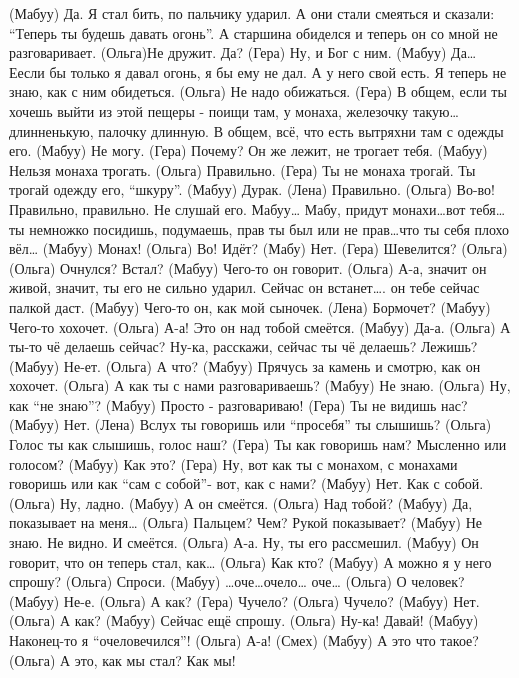  (Мабуу) Да. Я стал бить, по пальчику ударил. А они стали смеяться и сказали: ``Теперь ты будешь давать огонь''. А старшина обиделся и теперь он со мной не разговаривает.
 (Ольга)Не дружит. Да?
 (Гера) Ну, и Бог с ним.
 (Мабуу) Да… Еесли бы только я давал огонь, я бы ему не дал. А у него свой есть. Я теперь не знаю, как с ним обидеться. 
 (Ольга) Не надо обижаться. 
 (Гера)  В общем, если ты хочешь выйти из этой пещеры - поищи там, у монаха, железочку такую…длинненькую, палочку длинную. В общем, всё, что есть вытряхни там с одежды его.
 (Мабуу)  Не могу.
 (Гера)   Почему? Он же лежит, не трогает тебя.
 (Мабуу)  Нельзя монаха трогать. 
 (Ольга)  Правильно.
 (Гера)   Ты не монаха трогай. Ты трогай одежду его, ``шкуру''. 
 (Мабуу)  Дурак.
 (Лена)   Правильно.
 (Ольга)  Во-во! Правильно, правильно. Не слушай его. Мабуу… Мабу, придут монахи…вот тебя… ты немножко посидишь, подумаешь, прав ты был или не прав…что ты себя плохо вёл…
 (Мабуу) Монах!
 (Ольга) Во! Идёт?
 (Мабу)  Нет.
 (Гера)  Шевелится?  (Ольга) 
 (Ольга) Очнулся?  Встал?
 (Мабуу) Чего-то он говорит. 
 (Ольга) А-а, значит он живой, значит, ты его не сильно ударил. Сейчас он  встанет…. он тебе сейчас палкой даст.
 (Мабуу) Чего-то  он, как мой сыночек. 
 (Лена)  Бормочет?
 (Мабуу) Чего-то хохочет.
 (Ольга) А-а! Это он над тобой смеётся. 
 (Мабуу) Да-а.
 (Ольга) А ты-то чё делаешь сейчас? Ну-ка, расскажи, сейчас ты чё делаешь? Лежишь? 
 (Мабуу) Не-ет.
 (Ольга) А что?
 (Мабуу) Прячусь за камень и смотрю, как он хохочет.
 (Ольга) А как ты с нами разговариваешь?
 (Мабуу) Не знаю. 
 (Ольга) Ну, как ``не знаю''?
 (Мабуу) Просто - разговариваю!
 (Гера)  Ты не видишь нас?
 (Мабуу) Нет. 
 (Лена)  Вслух ты говоришь или ``просебя'' ты слышишь?
 (Ольга) Голос ты как слышишь, голос наш?
 (Гера)  Ты как говоришь нам? Мысленно или голосом?
 (Мабуу) Как это?
 (Гера)  Ну, вот как ты с монахом, с монахами  говоришь или как ``сам с собой”- вот,  как с нами?
 (Мабуу) Нет.  Как с собой. 
 (Ольга) Ну, ладно.
 (Мабуу) А он смеётся. 
 (Ольга) Над тобой?  
 (Мабуу) Да, показывает на меня…
 (Ольга) Пальцем? Чем?  Рукой показывает?
 (Мабуу) Не знаю. Не видно. И смеётся. 
 (Ольга) А-а. Ну, ты его рассмешил. 
 (Мабуу) Он говорит, что он теперь стал, как…
 (Ольга) Как кто? 
 (Мабуу) А можно я у него спрошу? 
 (Ольга) Спроси. 
 (Мабуу) …оче…очело… оче…
 (Ольга) О человек? 
 (Мабуу) Не-е.
 (Ольга) А как? 
 (Гера)  Чучело?
 (Ольга) Чучело? 
 (Мабуу) Нет.
 (Ольга) А как? 
 (Мабуу) Сейчас ещё спрошу.
 (Ольга) Ну-ка! Давай!
 (Мабуу) Наконец-то я ``очеловечился''!
 (Ольга) А-а! (Смех)
 (Мабуу) А это что такое?
 (Ольга) А это, как мы стал? Как мы!
